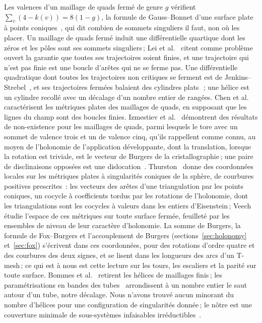 \documentclass[11pt,a4paper]{article}
\begin{document}
Les valences d'un maillage de quads fermé de genre $g$ vérifient $\sum_v (4 -
k(v)) = 8(1-g)$, la formule de Gauss--Bonnet d'une surface plate à points
coniques~\cite{troyanov1986surfaces}, qui dit combien de sommets singuliers il
faut, non où les placer. Un maillage de quads fermé induit une différentielle quartique dont
les zéros et les pôles sont ses sommets singuliers\,; Lei et
al.~\cite{lei2020quartic} citent comme problème ouvert la garantie que toutes
ses trajectoires soient finies, et une trajectoire qui n'est pas finie est une
boucle d'arêtes qui ne se ferme pas. Une différentielle quadratique dont
toutes les trajectoires non critiques se ferment est de
Jenkins--Strebel~\cite[\S20.1]{strebel1984quadratic}, et ses trajectoires
fermées balaient des cylindres plats~\cite[\S\S9.3, 20.2]{strebel1984quadratic}\,;
une hélice est un cylindre recollé avec un décalage d'un nombre
entier de rangées. Chen et al.~\cite{chen2019metric} caractérisent les
métriques plates des maillages de quads, en supposant que les lignes du champ
sont des boucles finies. Izmestiev et al.~\cite{izmestiev2013torus} démontrent
des résultats de non-existence pour les maillages de quads, parmi lesquels le
tore avec un sommet de valence trois et un de valence
cinq, qu'ils rappellent comme connu, au moyen de l'holonomie de l'application
développante, dont la translation, lorsque la rotation est triviale, est le
vecteur de Burgers de la cristallographie\,; une paire de disclinaisons
opposées est une dislocation~\cite{kleman2008disclinations}.
Thurston~\cite{thurston1998shapes} donne des coordonnées locales sur les
métriques plates à singularités coniques de la sphère, de courbures positives
prescrites~: les vecteurs des arêtes d'une triangulation par les points
coniques, un cocycle à coefficients tordus par les rotations de l'holonomie,
dont les triangulations sont les cocycles à valeurs dans les entiers
d'Eisenstein\,; Veech~\cite{veech1993flat} étudie l'espace de ces métriques
sur toute surface fermée, feuilleté par les ensembles de niveau de leur caractère
d'holonomie. La somme de Burgers, la formule de Fox--Burgers et l'accouplement
de Burgers (sections~\ref{sec:holonomy} et~\ref{sec:fox}) s'écrivent dans ces
coordonnées, pour des rotations d'ordre quatre et des courbures des deux
signes, et se lisent dans les longueurs des arcs d'un T-mesh\,; ce qui est à
nous est cette lecture sur les tours, les escaliers et la parité sur toute
surface. Bommes et
al.~\cite{bommes2011structure} retirent les hélices de maillages finis\,; les
paramétrisations en bandes des tubes~\cite{kalberer2011stripe} arrondissent à
un nombre entier le saut autour d'un tube, notre décalage. Nous n'avons trouvé
aucun minorant du nombre d'hélices pour une configuration de singularités
donnée\,; le nôtre est une couverture minimale de sous-systèmes infaisables
irréductibles~\cite{parker1996iis,amaldi2003maxfs}.
\end{document}
